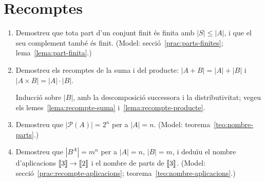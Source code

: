\section{Recomptes}

\begin{enumerate}[resume]
  \item Demostreu que tota part d'un conjunt finit és finita amb \(|S|\le|A|\), i que el seu complement també és finit. (Model: secció~\ref{prac:parts-finites}; lema~\ref{lema:part-finita}.)

  \item Demostreu els recomptes de la suma i del producte: \(|A+B|=|A|+|B|\) i \(|A\times B|=|A|\cdot|B|\). \begin{indicacio}Inducció sobre \(|B|\), amb la descomposició successora i la distributivitat; vegeu els lemes~\ref{lema:recompte-suma} i~\ref{lema:recompte-producte}.\end{indicacio}

  \item Demostreu que \(|\mathcal P(A)|=2^{n}\) per a \(|A|=n\). (Model: teorema~\ref{teo:nombre-parts}.)

  \item Demostreu que \(|B^{A}|=m^{n}\) per a \(|A|=n\), \(|B|=m\), i deduïu el nombre d'aplicacions \(\llbracket 3\rrbracket\to\llbracket 2\rrbracket\) i el nombre de parts de \(\llbracket 3\rrbracket\). (Model: secció~\ref{prac:recompte-aplicacions}; teorema~\ref{teo:nombre-aplicacions}.)
\end{enumerate}
